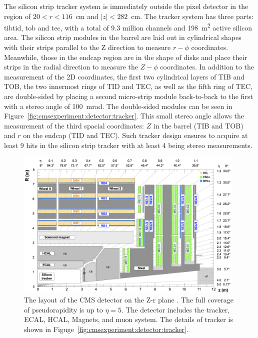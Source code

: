 The silicon strip tracker system is immediately outside the pixel detector in the region of $20<r<116$~cm and $|z|<282$~cm. The tracker system has three parts: \acrfull{tibtid}, \acrfull{tob} and \acrfull{tec}, with a total of 9.3 million channels and 198~\si{\m \squared} active silicon area. The silicon strip modules in the barrel are laid out in cylindrical shapes with their strips parallel to the Z direction to measure $r-\phi$ coordinates. Meanwhile, those in the endcap region are in the shape of disks and place their strips in the radial direction to measure the $Z-\phi$ coordinates. In addition to the measurement of the 2D coordinates, the first two cylindrical layers of TIB and TOB, the two innermost rings of TID and TEC, as well as the fifth ring of TEC, are double-sided by placing a second micro-strip module back-to-back to the first with a stereo angle of 100~mrad. The double-sided modules can be seen in Figure~\ref{fig:cmsexperiment:detector:tracker}. This small stereo angle allows the measurement of the third spacial coordinates: $Z$ in the barrel (TIB and TOB) and $r$ on the endcap (TID and TEC). Such tracker design ensures to acquire at least 9 hits in the silicon strip tracker with at least 4 being stereo measurements. 




\begin{figure}[ht]
    \centering
    \includegraphics[width=0.98\textwidth]{chapters/CMSExperiment/sectionDetector/figures/detectorLayout.png}
    \caption{The layout of the CMS detector on the Z-r plane \cite{cms:muonChamberWebsite}. The full coverage of pseudorapidity is up to $\eta=5$. The detector includes the tracker, ECAL, HCAL, Magnets, and muon system. The details of tracker is shown in Figuge~\ref{fig:cmsexperiment:detector:tracker}. }
    \label{fig:cmsexperiment:detector:detectorLayout}
\end{figure}





